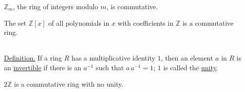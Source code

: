 \documentclass[12pt]{book}
\theoremstyle{definition}
\def\Z{\mathbb{Z}}
\begin{document}
\begin{tcexample}{}{}
$\Z_m$, the ring of integers modulo $m$, is commutative.
\end{tcexample}

\begin{tcexample}{}{}
The set $\Z[x]$ of all polynomials in $x$ with coefficients in $\Z$ is a commutative ring.
\end{tcexample}
~\\
\underline{Definition.} If a ring $R$ has a multiplicative identity $1$, then an element $a$ in $R$ is an \underline{invertible} if there is an $a^{-1}$ such that $a\,a^{-1}=1$; $1$ is called the \underline{unity}.\\

\begin{tcexample}{}{}
 $2\Z$ is a commutative ring with no unity.
\end{tcexample}
\end{document}
